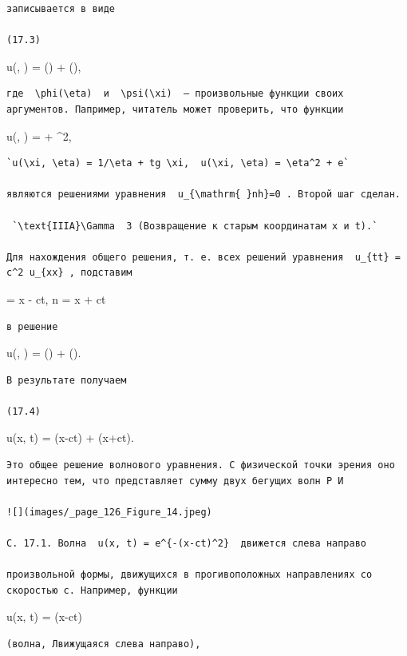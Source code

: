 \documentclass[
  ukrainian,
]{article}
\begin{document}
\begin{verbatim}
записывается в виде

(17.3)
\end{verbatim}

u(\xi, \eta) = \varphi(\eta) + \psi(\xi),

\begin{verbatim}
где  \phi(\eta)  и  \psi(\xi)  — произвольные функции своих аргументов. Папример, читатель может проверить, что функции
\end{verbatim}

u(\xi, \eta) = \sin \eta + \xi\^{}2,

\begin{verbatim}
`u(\xi, \eta) = 1/\eta + tg \xi,  u(\xi, \eta) = \eta^2 + e`

являются решениями уравнения  u_{\mathrm{ }nh}=0 . Второй шаг сделан.

 `\text{IIIA}\Gamma  3 (Возвращение к старым координатам x и t).`

Для нахождения общего решения, т. е. всех решений уравнения  u_{tt} = c^2 u_{xx} , подставим
\end{verbatim}

\xi = x - ct, n = x + ct

\begin{verbatim}
в решение
\end{verbatim}

u(\xi, \eta) = \varphi(\eta) + \psi(\xi).

\begin{verbatim}
В результате получаем

(17.4)
\end{verbatim}

u(x, t) = \varphi(x-ct) + \psi(x+ct).

\begin{verbatim}
Это общее решение волнового уравнения. С физической точки эрения оно интересно тем, что представляет сумму двух бегущих волн Р И

![](images/_page_126_Figure_14.jpeg)

С. 17.1. Волна  u(x, t) = e^{-(x-ct)^2}  движется слева направо

произвольной формы, движущихся в прогивоположных направлениях со скоростью c. Например, функции
\end{verbatim}

u(x, t) = \sin(x-ct)

\begin{verbatim}
(волна, Лвижущаяся слева направо),
\end{verbatim}
\end{document}
